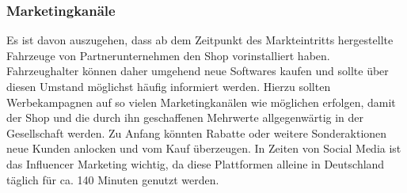 \subsubsection{Marketingkanäle} 
Es ist davon auszugehen, dass ab dem Zeitpunkt des Markteintritts hergestellte Fahrzeuge von Partnerunternehmen den Shop vorinstalliert haben. Fahrzeughalter können daher umgehend neue Softwares kaufen und sollte über diesen Umstand möglichst häufig informiert werden. Hierzu sollten Werbekampagnen auf so vielen Marketingkanälen wie möglichen erfolgen, damit der Shop und die durch ihn geschaffenen Mehrwerte allgegenwärtig in der Gesellschaft werden. Zu Anfang könnten Rabatte oder weitere Sonderaktionen neue Kunden anlocken und vom Kauf überzeugen. In Zeiten von Social Media ist das Influencer Marketing wichtig, da diese Plattformen alleine in Deutschland täglich für ca. 140 Minuten genutzt werden.\cite[Vgl. ]{socialmedia}

